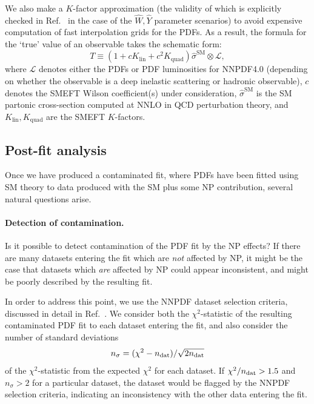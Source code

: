 \documentclass[withindex,glossary]{cam-thesis}
\begin{document}
We also make a $K$-factor approximation (the validity of which is explicitly checked in Ref.~\cite{DYpaper} in the case of the $\hat{W},\hat{Y}$ 
parameter scenarios) to avoid expensive computation of fast interpolation grids for the PDFs. As a result, the formula for the `true' value of 
an observable takes the schematic form:
\begin{equation}
T \equiv \left(1 + cK_{\text{lin}} + c^2K_{\text{quad}}\right) \hat{\sigma}^{\text{SM}} \otimes \mathcal{L},
\end{equation}
where $\mathcal{L}$ denotes either the PDFs or PDF luminosities for NNPDF4.0 (depending on whether the observable is a deep inelastic scattering or hadronic observable), $c$ denotes the SMEFT Wilson coefficient(s) under consideration, $\hat{\sigma}^{\text{SM}}$ is the SM partonic cross-section computed at NNLO in QCD perturbation theory, and $K_{\text{lin}}, K_{\text{quad}}$ are the SMEFT $K$-factors.



\subsection{Post-fit analysis}
\label{subsec:postfit}

Once we have produced a contaminated fit, where PDFs have been fitted using SM theory to data produced with the SM plus some NP contribution, several natural questions arise.

\paragraph{Detection of contamination.} Is it possible to detect contamination of the PDF fit by the NP effects? If there are many datasets entering the fit which are \textit{not} affected by NP, it might be the case that datasets which \textit{are} affected by NP could appear inconsistent, and might be poorly described by the resulting fit.

In order to address this point, we use the NNPDF dataset selection criteria, discussed in detail in Ref.~\cite{Ball:2021leu}. We consider both the $\chi^2$-statistic of the resulting contaminated PDF fit to each dataset entering the fit, and also consider the number of standard deviations 
\begin{equation}
\label{eq:nsigma}
n_{\sigma} = (\chi^2 - n_{\rm dat}) / \sqrt{2n_{\rm dat}}
\end{equation} 
of the $\chi^2$-statistic from the expected $\chi^2$ for each dataset. 
If $\chi^2/n_{\rm dat} > 1.5$ and $n_{\sigma} > 2$ for a particular dataset, the dataset would be flagged by the NNPDF selection criteria, indicating an inconsistency with the other data entering the fit.
\end{document}
